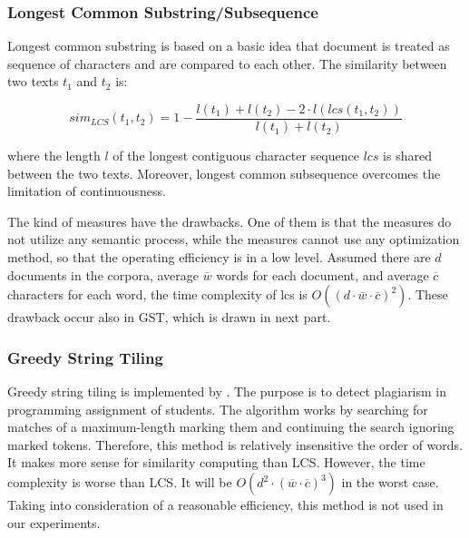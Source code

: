 \subsubsection{Longest Common Substring/Subsequence}

Longest common substring is based on a basic idea that document is treated as sequence of characters and are compared to each other. The similarity between two texts $t_1$ and $t_2$ is:

\begin{equation}
    sim_{LCS}(t_1, t_2) = 1 -  \frac{l(t_1) + l(t_2) - 2 \cdot l(lcs(t_1, t_2))}{l(t_1) + l(t_2)}
\end{equation}

where the length $l$ of the longest contiguous character sequence $lcs$ is shared between the two texts. Moreover, longest common subsequence overcomes the limitation of continuousness. 

The kind of measures have the drawbacks. One of them is that the measures do not utilize any semantic process, while the measures cannot use any optimization method, so that the operating efficiency is in a low level. Assumed there are $d$ documents in the corpora, average $\overline{w}$ words for each document, and average $\overline{c}$ characters for each word, the time complexity of lcs is $O((d \cdot \overline{w} \cdot \overline{c})^2)$. These drawback occur also in GST, which is drawn in next part. 

\subsubsection{Greedy String Tiling}

Greedy string tiling is implemented by \cite{wise1993string}. The purpose is to detect plagiarism in programming assignment of students. The algorithm works by searching for matches of a maximum-length marking them and continuing the search ignoring marked tokens. Therefore, this method is relatively insensitive the order of words. It makes more sense for similarity computing than LCS. However, the time complexity is worse than LCS. It will be  $O(d^2 \cdot (\overline{w} \cdot \overline{c})^3)$ in the worst case. Taking into consideration of a reasonable efficiency, this method is not used in our experiments.


\subsubsection{\cite{islam2008semantic}}

